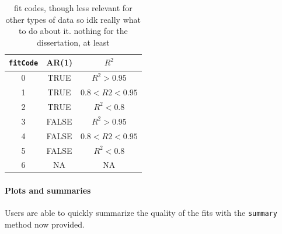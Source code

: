 \documentclass{article}
\newcommand{\xt}{\texttt}%
\begin{document}
\begin{singlespace}
\begin{table}[H]
\centering
\def\arraystretch{1.5}
\begin{tabular}{|c|c|c|}
\hline
\xt{fitCode} & AR(1) & $R^2$ \\
\hline
0 & TRUE & $R^2 > 0.95$ \\
1 & TRUE & $0.8 < R2 < 0.95$ \\
2 & TRUE & $ R^2 <0.8$ \\
3 & FALSE & $R^2 >0.95$ \\
4 & FALSE & $0.8 < R2 < 0.95$ \\
5 & FALSE &$ R^2 <0.8$  \\
6 & NA & NA \\
\hline
\end{tabular}
\caption{fit codes, though less relevant for other types of data so idk really what to do about it. nothing for the dissertation, at least}
\label{tab:fit_codes}
\end{table}
\end{singlespace}


\paragraph{Plots and summaries}

Users are able to quickly summarize the quality of the fits with the \xt{summary} method now provided. 
\end{document}
